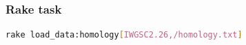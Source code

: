 \subsubsection{Rake task}\label{rake-task-3}

\begin{lstlisting}[language=sh]
rake load_data:homology[IWGSC2.26,/homology.txt]
\end{lstlisting}

